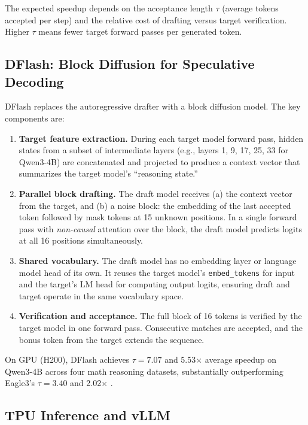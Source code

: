 \documentclass[12pt,letterpaper]{article}
\begin{document}
The expected speedup depends on the acceptance length $\tau$ (average tokens accepted per step) and the relative cost of drafting versus target verification. Higher $\tau$ means fewer target forward passes per generated token.

\subsection{DFlash: Block Diffusion for Speculative Decoding}

DFlash \citep{chen2026dflashblockdiffusionflash} replaces the autoregressive drafter with a block diffusion model. The key components are:

\begin{enumerate}
    \item \textbf{Target feature extraction.} During each target model forward pass, hidden states from a subset of intermediate layers (e.g., layers 1, 9, 17, 25, 33 for Qwen3-4B) are concatenated and projected to produce a context vector that summarizes the target model's ``reasoning state.''
    \item \textbf{Parallel block drafting.} The draft model receives (a) the context vector from the target, and (b) a noise block: the embedding of the last accepted token followed by mask tokens at 15 unknown positions. In a single forward pass with \emph{non-causal} attention over the block, the draft model predicts logits at all 16 positions simultaneously.
    \item \textbf{Shared vocabulary.} The draft model has no embedding layer or language model head of its own. It reuses the target model's \texttt{embed\_tokens} for input and the target's LM head for computing output logits, ensuring draft and target operate in the same vocabulary space.
    \item \textbf{Verification and acceptance.} The full block of 16 tokens is verified by the target model in one forward pass. Consecutive matches are accepted, and the bonus token from the target extends the sequence.
\end{enumerate}

On GPU (H200), DFlash achieves $\tau=7.07$ and 5.53$\times$ average speedup on Qwen3-4B across four math reasoning datasets, substantially outperforming Eagle3's $\tau=3.40$ and 2.02$\times$ \citep{chen2026dflashblockdiffusionflash}.

\subsection{TPU Inference and vLLM}
\end{document}
